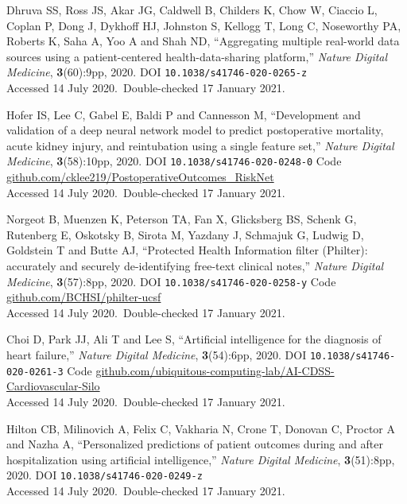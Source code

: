 \vbox{
Dhruva SS,  Ross JS,  Akar JG,   Caldwell B,  Childers K,  Chow W,  Ciaccio L,  Coplan P,  Dong J,  Dykhoff HJ,  Johnston S,  Kellogg T,  Long C,  Noseworthy PA,  Roberts K,  Saha A,  Yoo A and  Shah ND, ``Aggregating multiple real-world data sources using a patient-centered health-data-sharing platform,'' \emph{Nature Digital Medicine}, \textbf{3}(60):9pp, 2020. DOI \texttt{10.1038/s41746-020-0265-z}\\\hfill{Accessed 14 July 2020.}\ {Double-checked 17 January 2021}.}\bibskip

\vbox{
Hofer IS,  Lee C,  Gabel E,  Baldi P and  Cannesson M, ``Development and validation of a deep neural network model to predict postoperative mortality, acute kidney injury, and reintubation using a single feature set,'' \emph{Nature Digital Medicine}, \textbf{3}(58):10pp, 2020. DOI \texttt{10.1038/s41746-020-0248-0} {Code \url{github.com/cklee219/PostoperativeOutcomes_RiskNet}}\\\hfill{Accessed 14 July 2020.}\ {Double-checked 17 January 2021}.}\bibskip

\vbox{
Norgeot B,  Muenzen K,  Peterson TA,  Fan X,  Glicksberg BS,  Schenk G,  Rutenberg E,  Oskotsky B,  Sirota M,  Yazdany J,  Schmajuk G,  Ludwig D,  Goldstein T and  Butte AJ, ``Protected Health Information filter (Philter): accurately and securely de-identifying free-text clinical notes,'' \emph{Nature Digital Medicine}, \textbf{3}(57):8pp, 2020. DOI \texttt{10.1038/s41746-020-0258-y} {Code \url{github.com/BCHSI/philter-ucsf}}\\\hfill{Accessed 14 July 2020.}\ {Double-checked 17 January 2021}.}\bibskip

\vbox{
Choi D,  Park JJ,  Ali T and  Lee S, ``Artificial intelligence for the diagnosis of heart failure,'' \emph{Nature Digital Medicine}, \textbf{3}(54):6pp, 2020. DOI \texttt{10.1038/s41746-020-0261-3} {Code \url{github.com/ubiquitous-computing-lab/AI-CDSS-Cardiovascular-Silo}}\\\hfill{Accessed 14 July 2020.}\ {Double-checked 17 January 2021}.}\bibskip

\vbox{
Hilton CB,  Milinovich A,  Felix C,  Vakharia N,   Crone T,   Donovan C,  Proctor A and  Nazha A, ``Personalized predictions of patient outcomes during and after hospitalization using artificial intelligence,'' \emph{Nature Digital Medicine}, \textbf{3}(51):8pp, 2020. DOI \texttt{10.1038/s41746-020-0249-z}\\\hfill{Accessed 14 July 2020.}\ {Double-checked 17 January 2021}.}\bibskip

